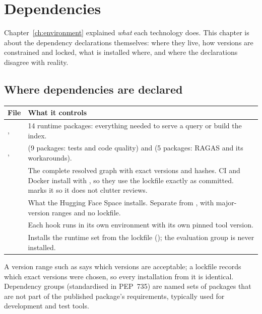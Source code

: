 \chapter{Dependencies}
\label{ch:dependencies}

Chapter~\ref{ch:environment} explained \emph{what} each technology does. This chapter is about the dependency declarations themselves: where they live, how versions are constrained and locked, what is installed where, and where the declarations disagree with reality.

\section{Where dependencies are declared}

\begin{center}
\begin{tabularx}{\textwidth}{@{}>{\raggedright\arraybackslash}p{4.2cm}L@{}}
\toprule
\textbf{File} & \textbf{What it controls}\\
\midrule
{},  & 14 runtime packages: everything needed to serve a query or build the index.\\
,  &  (9 packages: tests and code quality) and  (5 packages: RAGAS and its workarounds).\\
 & The complete resolved graph with exact versions and hashes. CI and Docker install with , so they use the lockfile exactly as committed.  marks it  so it does not clutter reviews.\\
 & What the Hugging Face Space installs. Separate from , with major-version ranges and no lockfile.\\
 & Each hook runs in its own environment with its own pinned tool version.\\
 & Installs the runtime set from the lockfile (); the evaluation group is never installed.\\
\bottomrule
\end{tabularx}
\end{center}

\begin{background}
A version range such as  says which versions are acceptable; a lockfile records which exact versions were chosen, so every installation from it is identical. Dependency groups (standardised in PEP~735) are named sets of packages that are not part of the published package's requirements, typically used for development and test tools.
\end{background}

